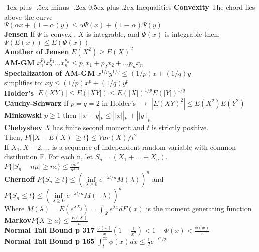 \documentclass[10pt,landscape]{article}
\makeatletter
\renewcommand{\section}{\@startsection{section}{1}{0mm}%
                                {-1ex plus -.5ex minus -.2ex}%
                                {0.5ex plus .2ex}%
                                {\normalfont\large\bfseries}}
\makeatother
\begin{document}
\begin{multicols*}{3}
\section{Inequalities}
\textbf{Convexity} The chord lies above the curve\\
$\Psi(\alpha x +(1-\alpha)y)\leq \alpha\Psi(x)+(1-\alpha)\Psi(y)$\\
\textbf{Jensen} If $\Psi$ is convex , $X$ is integrable, and $\Psi(x)$ is integrable then:
$\Psi(E(x))\leq E(\Psi(x))$\\
\textbf{Another of Jensen} $E(X^2)\geq E(X)^2$\\
\textbf{AM-GM} $ x_1^{p_1} x_2^{p_2}...x_n^{p_n}\leq p_1 x_1 +p_2 x_2 + ... p_n x_n$\\
\textbf{Specialization of AM-GM} $x^{1/p} y^{1/q} \leq (1/p) x +(1/q) y$\\
simplifies to: $ xy \leq (1/p) x^p +(1/q) y^p$\\
\textbf{Holder's} $|E(XY)| \leq E(|XY|) \leq E(|X|)^{1/p} E(|Y|)^{1/q}$\\ 
\textbf{Cauchy-Schwarz} If $p=q=2$ in Holder's $\rightarrow$ $|E(XY)^2| \leq E(X^2)E(Y^2)$\\
\textbf{Minkowski} $p\geq 1$ then $ ||x+y|_p \leq ||x||_p + ||y||_p$\\
\textbf{Chebyshev} $X$ has finite second moment and $t$ is strictly positive.\\
Then, $P\{|X-E(X)|\geq t\}\leq Var(X)/t^{2}$\\
If $X_1,X-2,...$ is a sequence of independent random variable with common distibution F. For each n, let $S_n=(X_1+...+X_n)$.\\
$P\{|S_n-n\mu|\geq n\epsilon\}\leq \frac{n\sigma^2}{n^2\epsilon^2}$\\
\textbf{Chernoff} $P\{S_n\geq t\} \leq (\inf\limits_{\lambda\geq 0} e^{-\lambda t/n}M(\lambda))^n $ and\\
$P\{S_n\leq t\} \leq (\inf\limits_{\lambda\geq 0} e^{-\lambda t/n}M(-\lambda))^n $\\ 
Where $M(\lambda)=E(e^{\lambda X_j})=\int_{\mathcal{R}} e^{\lambda x}dF(x)$ is the moment generating function\\
\textbf{Markov}$P\{X\geq a\} \leq \frac {E(X)}{a}$\\
\textbf{Normal Tail Bound p 317} $\frac{\phi(x)}{x}(1-\frac{1}{x^2}) < 1- \Phi(x) < \frac {\phi(x)}{x} $\\
\textbf{Normal Tail Bound p 165} $\int_{t}^{\infty}\phi(x) dx \leq \frac{1}{2}e^{-t^2/2}$

\end{multicols*}
\end{document}
